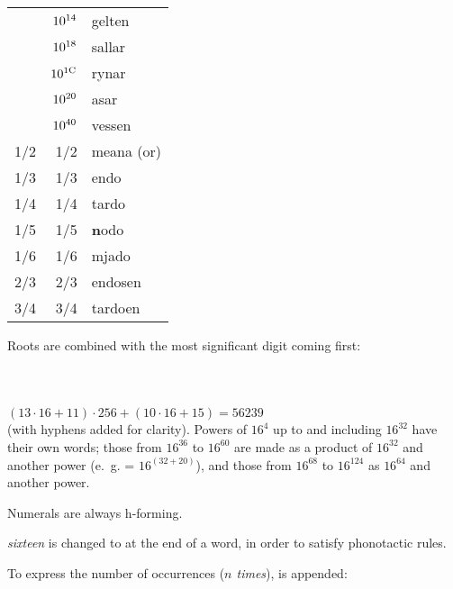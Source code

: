 \documentclass{book}
\begin{document}
\begin{longtable}[c]{|r|r|l|}
  & $\textmd{10}^{\textmd{14}}$ & gelten \\
  & $\textmd{10}^{\textmd{18}}$ & sallar \\
  & $\textmd{10}^{\textmd{1C}}$ & rynar \\
  & $\textmd{10}^{\textmd{20}}$ & asar \\
  & $\textmd{10}^{\textmd{40}}$ & vessen \\
  \hline
  \hline
  1/2 & 1/2 & meana (or) \\
  1/3 & 1/3 & endo \\
  1/4 & 1/4 & tardo \\
  1/5 & 1/5 & \textbf{n}odo \\
  1/6 & 1/6 & mjado \\
  2/3 & 2/3 & endosen \\
  3/4 & 3/4 & tardoen \\
  \hline
\end{longtable}

Roots are combined with the most significant digit coming first: \\
~\\
 \\
 \\
$(13 \cdot 16 + 11) \cdot 256 + (10 \cdot 16 + 15) = 56239$ \\

(with hyphens added for clarity). Powers of $16^4$ up to and including $16^32$ have their own words; those from $16^36$ to $16^60$ are made as a product of $16^32$ and another power (e.~g.  = $16^(32 + 20)$), and those from $16^68$ to $16^124$ as $16^64$ and another power.

Numerals are always h-forming.

 \emph{sixteen} is changed to  at the end of a word, in order to satisfy phonotactic rules.

To express the number of occurrences (\emph{$n$ times}),  is appended: \\
~\\
    \\
    \\
    \\
\end{document}
